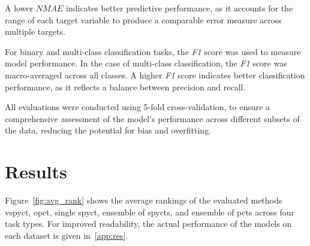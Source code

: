\documentclass[3p,review,authoryear]{elsarticle}
\begin{document}
A lower \(\textit{NMAE}\) indicates better predictive performance, as it accounts for the range of each target variable to produce a comparable error measure across multiple targets.


For binary and multi-class classification tasks, the \textit{F1} score was used to measure model performance.
In the case of multi-class classification, the \textit{F1} score was macro-averaged across all classes.
A higher \textit{F1} score indicates better classification performance, as it reflects a balance between precision and recall.

All evaluations were conducted using 5-fold cross-validation, to ensure a comprehensive assessment of the model's performance across different subsets of the data, reducing the potential for bias and overfitting.


\section{Results}

Figure~\ref{fig:avg_rank} shows the average rankings of the evaluated methods \gls{vspyct}, \gls{opct}, single \gls{spyct}, ensemble of \glspl{spyct}, and ensemble of \glspl{pct} across four task types.
For improved readability, the actual performance of the models on each dataset is given in~\ref{app:res}.
\end{document}
